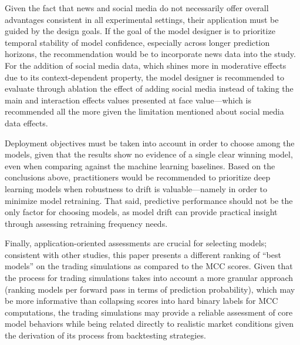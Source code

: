 \documentclass[stu,floatsintext]{apa7}
\begin{document}
Given the fact that news and social media do not necessarily offer overall advantages consistent in all experimental settings, their application must be guided by the design goals. If the goal of the model designer is to prioritize temporal stability of model confidence, especially across longer prediction horizons, the recommendation would be to incorporate news data into the study. For the addition of social media data, which shines more in moderative effects due to its context-dependent property, the model designer is recommended to evaluate through ablation the effect of adding social media instead of taking the main and interaction effects values presented at face value—which is recommended all the more given the limitation mentioned about social media data effects.

Deployment objectives must be taken into account in order to choose among the models, given that the results show no evidence of a single clear winning model, even when comparing against the machine learning baselines. Based on the conclusions above, practitioners would be recommended to prioritize deep learning models when robustness to drift is valuable—namely in order to minimize model retraining. That said, predictive performance should not be the only factor for choosing models, as model drift can provide practical insight through assessing retraining frequency needs.

Finally, application-oriented assessments are crucial for selecting models; consistent with other studies, this paper presents a different ranking of ``best models'' on the trading simulations as compared to the MCC scores. Given that the process for trading simulations takes into account a more granular approach (ranking models per forward pass in terms of prediction probability), which may be more informative than collapsing scores into hard binary labels for MCC computations, the trading simulations may provide a reliable assessment of core model behaviors while being related directly to realistic market conditions given the derivation of its process from backtesting strategies.

\newpage
\printbibliography[title={REFERENCES}]
\end{document}
